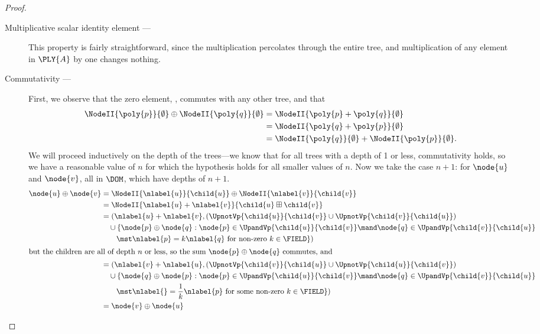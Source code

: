 \begin{definition}
\begin{proposition}
\begin{proof}
\begin{description}
    \item[Multiplicative scalar identity element --- ]
      This property is fairly straightforward, since the
      multiplication percolates through the entire tree, and
      multiplication of any element in $\PLY{A}$ by one changes nothing.

    \item[Commutativity --- ]
      First, we observe that the zero element, \tzerotree, commutes
      with any other tree, and that
      \begin{align}
        \NodeII{\poly{p}}{\emptyset}\oplus\NodeII{\poly{q}}{\emptyset} &=\NodeII{\poly{p}+\poly{q}}{\emptyset}\\
        &=\NodeII{\poly{q}+\poly{p}}{\emptyset}\\
        &=\NodeII{\poly{q}}{\emptyset}+\NodeII{\poly{p}}{\emptyset}.
      \end{align}
      We will proceed inductively on the depth of the trees---we know
      that for all trees with a depth of 1 or less, commutativity
      holds, so we have a reasonable value of $n$ for which the
      hypothesis holds for all smaller values of $n$.  Now we take
      the case $n+1$: for $\node{u}$ and $\node{v}$, all in $\DOM$, which have depths
      of $n+1$.
      \begin{align}
        \node{u}\oplus\node{v}&=\NodeII{\nlabel{u}}{\child{u}}\oplus\NodeII{\nlabel{v}}{\child{v}}\\
        &=\NodeII{\nlabel{u}+\nlabel{v}}{\child{u}\boxplus\child{v}}\\
        &=(\nlabel{u}+\nlabel{v},(\UpnotVp{\child{u}}{\child{v}} \cup \UpnotVp{\child{v}}{\child{u}})\\
          &\quad\cup\{\node{p}\oplus\node{q}:\node{p}\in\UpandVp{\child{u}}{\child{v}}\mand\node{q}\in\UpandVp{\child{v}}{\child{u}}\\
          &\qquad\mst\nlabel{p}=k\/\nlabel{q}\text{~for non-zero~}k\in\FIELD\})\\
        \intertext{but the children are all of depth $n$ or less, so
          the sum $\node{p}\oplus\node{q}$ commutes, and}
        &=(\nlabel{v}+\nlabel{u}, (\UpnotVp{\child{v}}{\child{u}} \cup \UpnotVp{\child{u}}{\child{v}})\\
          &\quad\cup\{\node{q}\oplus\node{p}:\node{p}\in\UpandVp{\child{u}}{\child{v}}\mand\node{q}\in\UpandVp{\child{v}}{\child{u}}\\
          &\qquad\mst\nlabel{}=\frac{1}{k}\nlabel{p}\text{~for some non-zero~}k\in\FIELD\})\\
        &=\node{v}\oplus\node{u}
      \end{align}


\end{description}
\end{proof}
\end{proposition}
\end{definition}
